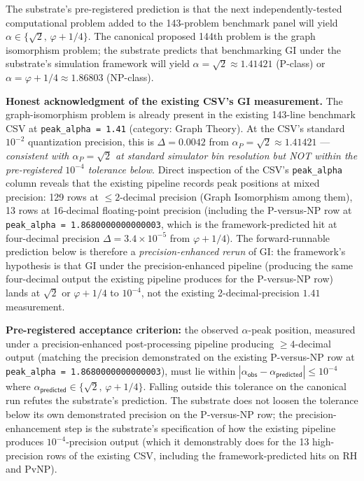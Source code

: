 \documentclass[11pt,a4paper]{amsart}
\theoremstyle{plain}
\theoremstyle{definition}
\begin{document}
The substrate's pre-registered prediction is that the next independently-tested computational problem added to the 143-problem benchmark panel will yield $\alpha\in\{\sqrt{2},\,\varphi+1/4\}$. The canonical proposed 144th problem is the graph isomorphism problem; the substrate predicts that benchmarking GI under the substrate's simulation framework will yield $\alpha = \sqrt{2}\approx 1.41421$ (P-class) or $\alpha = \varphi+1/4 \approx 1.86803$ (NP-class).

\textbf{Honest acknowledgment of the existing CSV's GI measurement.} The graph-isomorphism problem is already present in the existing 143-line benchmark CSV at \texttt{peak\_alpha = 1.41} (category: Graph Theory). At the CSV's standard $10^{-2}$ quantization precision, this is $\Delta = 0.0042$ from $\alpha_{P} = \sqrt{2} \approx 1.41421$ --- \emph{consistent with $\alpha_{P} = \sqrt{2}$ at standard simulator bin resolution but NOT within the pre-registered $10^{-4}$ tolerance below}. Direct inspection of the CSV's \texttt{peak\_alpha} column reveals that the existing pipeline records peak positions at mixed precision: 129 rows at $\le 2$-decimal precision (Graph Isomorphism among them), 13 rows at 16-decimal floating-point precision (including the P-versus-NP row at \texttt{peak\_alpha = 1.8680000000000003}, which is the framework-predicted hit at four-decimal precision $\Delta = 3.4 \times 10^{-5}$ from $\varphi + 1/4$). The forward-runnable prediction below is therefore a \emph{precision-enhanced rerun} of GI: the framework's hypothesis is that GI under the precision-enhanced pipeline (producing the same four-decimal output the existing pipeline produces for the P-versus-NP row) lands at $\sqrt{2}$ or $\varphi + 1/4$ to $10^{-4}$, not the existing 2-decimal-precision $1.41$ measurement.

\textbf{Pre-registered acceptance criterion:} the observed $\alpha$-peak position, measured under a precision-enhanced post-processing pipeline producing $\ge 4$-decimal output (matching the precision demonstrated on the existing P-versus-NP row at \texttt{peak\_alpha = 1.8680000000000003}), must lie within $|\alpha_{\textsf{obs}} - \alpha_{\textsf{predicted}}| \le 10^{-4}$ where $\alpha_{\textsf{predicted}} \in \{\sqrt{2},\,\varphi + 1/4\}$. Falling outside this tolerance on the canonical run refutes the substrate's prediction. The substrate does not loosen the tolerance below its own demonstrated precision on the P-versus-NP row; the precision-enhancement step is the substrate's specification of how the existing pipeline produces $10^{-4}$-precision output (which it demonstrably does for the 13 high-precision rows of the existing CSV, including the framework-predicted hits on RH and PvNP).
\end{document}
